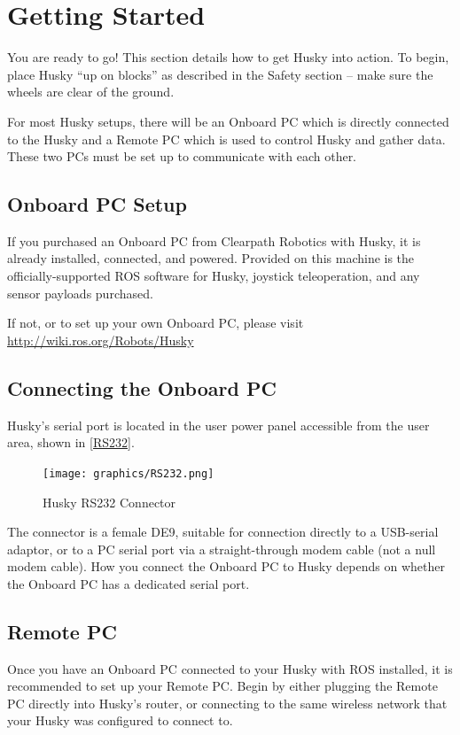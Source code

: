 \documentclass[]{clearpath-latex/clearpath-manual}
\begin{document}
\section{Getting Started}

You are ready to go! This section details how to get Husky into action.
To begin, place Husky “up on blocks” as described in the Safety section – make sure the wheels are clear of the ground.

For most Husky setups, there will be an Onboard PC which is directly connected to the Husky and a Remote PC which is used to control Husky and gather data. These two PCs must be set up to communicate with each other.


\subsection{Onboard PC Setup}

If you purchased an Onboard PC from Clearpath Robotics with Husky, it is already installed, connected, and powered.
Provided on this machine is the officially-supported ROS software for Husky, joystick teleoperation, and any sensor payloads purchased.

If not, or to set up your own Onboard PC, please visit \url{http://wiki.ros.org/Robots/Husky}


\subsection{Connecting the Onboard PC}

Husky’s serial port is located in the user power panel accessible from the user area, shown in \autoref{RS232}.

\begin{figure}[h]
	\centering
	\texttt{[image: graphics/RS232.png]}
	\caption{Husky RS232 Connector}
	\label{RS232}
\end{figure}

The connector is a female DE9, suitable for connection directly to a USB-serial adaptor,
or to a PC serial port via a straight-through modem cable (not a null modem cable).
How you connect the Onboard PC to Husky depends on whether the Onboard PC has a dedicated serial port.

\subsection{Remote PC}

Once you have an Onboard PC connected to your Husky with ROS installed, it is recommended to set up your Remote PC.
Begin by either plugging the Remote PC directly into Husky’s router, or connecting to the same wireless network
that your Husky was configured to connect to.
\end{document}
